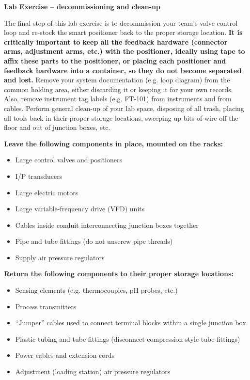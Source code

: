\vfil \eject

\noindent
{\bf Lab Exercise -- decommissioning and clean-up}

\vskip 5pt

The final step of this lab exercise is to decommission your team's valve control loop and re-stock the smart positioner back to the proper storage location.  {\bf It is critically important to keep all the feedback hardware (connector arms, adjustment arms, etc.) with the positioner, ideally using tape to affix these parts to the positioner, or placing each positioner and feedback hardware into a container, so they do not become separated and lost.}  Remove your system documentation (e.g. loop diagram) from the common holding area, either discarding it or keeping it for your own records.  Also, remove instrument tag labels (e.g. FT-101) from instruments and from cables.  Perform general clean-up of your lab space, disposing of all trash, placing all tools back in their proper storage locations, sweeping up bits of wire off the floor and out of junction boxes, etc.

\vskip 10pt

\indent
{\bf Leave the following components in place, mounted on the racks:}

\begin{itemize}
\item{} Large control valves and positioners
\item{} I/P transducers
\item{} Large electric motors
\item{} Large variable-frequency drive (VFD) units
\item{} Cables inside conduit interconnecting junction boxes together
\item{} Pipe and tube fittings (do not unscrew pipe threads)
\item{} Supply air pressure regulators
\end{itemize}

\vskip 10pt

\indent
{\bf Return the following components to their proper storage locations:}

\begin{itemize}
\item{} Sensing elements (e.g. thermocouples, pH probes, etc.)
\item{} Process transmitters
\item{} ``Jumper'' cables used to connect terminal blocks within a single junction box
\item{} Plastic tubing and tube fittings (disconnect compression-style tube fittings)
\item{} Power cables and extension cords
\item{} Adjustment (loading station) air pressure regulators
\end{itemize}


